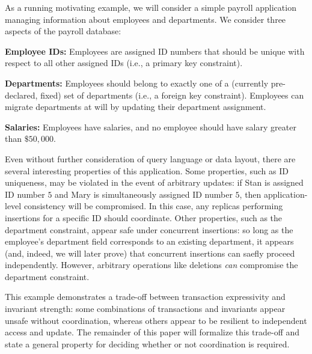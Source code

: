 


 As a running motivating example, we will
consider a simple payroll application managing information about
employees and departments. We consider three aspects of the payroll
database:
\begin{myitemize}
\item\textbf{Employee IDs:} Employees are assigned ID numbers that
  should be unique with respect to all other assigned IDs (i.e., a
  primary key constraint).
\item\textbf{Departments:} Employees should belong to exactly one of a
  (currently pre-declared, fixed) set of departments (i.e., a foreign
  key constraint). Employees can migrate departments at will by
  updating their department assignment.
\item\textbf{Salaries:} Employees have salaries, and no employee
  should have salary greater than $\$50,000$.
\end{myitemize}
Even without further consideration of query language or data layout,
there are several interesting properties of this application. Some
properties, such as ID uniqueness, may be violated in the event of
arbitrary updates: if Stan is assigned ID number $5$ and Mary is
simultaneously assigned ID number $5$, then application-level
consistency will be compromised. In this case, any replicas performing
insertions for a specific ID should coordinate. Other properties, such
as the department constraint, appear safe under concurrent insertions:
so long as the employee's department field corresponds to an existing
department, it appears (and, indeed, we will later prove) that
concurrent insertions can saefly proceed independently. However,
arbitrary operations like deletions \textit{can} compromise the
department constraint.

This example demonstrates a trade-off between transaction expressivity
and invariant strength: some combinations of transactions and
invariants appear unsafe without coordination, whereas others appear
to be resilient to independent access and update. The remainder of this paper
will formalize this trade-off and state a general
property for deciding whether or not coordination is required.
